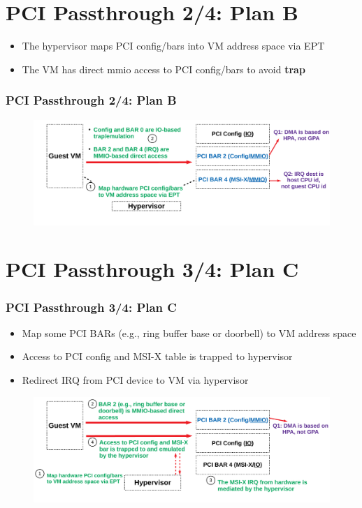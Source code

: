 \documentclass[aspectratio=169]{beamer}
\begin{document}

\section{PCI Passthrough 2/4: Plan B}
\begin{frame}
\begin{itemize}
\item The hypervisor maps PCI config/bars into VM address space via EPT
\item The VM has direct mmio access to PCI config/bars to avoid \textbf{trap}
\end{itemize}
\frametitle{PCI Passthrough 2/4: Plan B}
\begin{figure}
\includegraphics[width=1.0\linewidth]{figures/plan_b.pdf}
\end{figure}
\end{frame}


\section{PCI Passthrough 3/4: Plan C}
\begin{frame}
\frametitle{PCI Passthrough 3/4: Plan C}
\begin{itemize}
\item Map some PCI BARs (e.g., ring buffer base or doorbell) to VM address space
\item Access to PCI config and MSI-X table is trapped to hypervisor
\item Redirect IRQ from PCI device to VM via hypervisor
\end{itemize}
\begin{figure}
\includegraphics[width=1.0\linewidth]{figures/plan_c.pdf}
\end{figure}
\end{frame}
\end{document}
